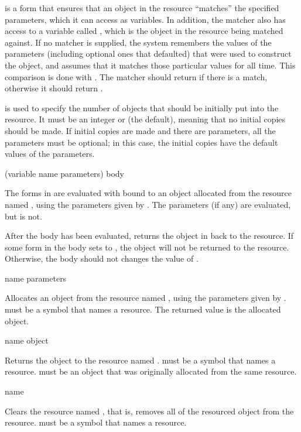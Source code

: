  is a form that ensures that an object in the resource ``matches''
the specified parameters, which it can access as variables.  In addition, the
matcher also has access to a variable called , which is the object in
the resource being matched against.  If no matcher is supplied, the system
remembers the values of the parameters (including optional ones that defaulted)
that were used to construct the object, and assumes that it matches those
particular values for all time. This comparison is done with .  The
matcher should return  if there is a match, otherwise it should
return .

 is used to specify the number of objects that should be
initially put into the resource.  It must be an integer or  (the
default), meaning that no initial copies should be made.  If initial copies are
made and there are parameters, all the parameters must be optional; in this
case, the initial copies have the default values of the parameters.


 {(variable name \rest parameters) \body body}

The forms in  are evaluated with  bound to an object
allocated from the resource named , using the parameters given by
.  The parameters (if any) are evaluated, but  is
not.

After the body has been evaluated,  returns the object in
 back to the resource.  If some form in the body sets
 to , the object will not be returned to the resource.
Otherwise, the body should not changes the value of .


 {name \rest parameters}

Allocates an object from the resource named , using the parameters
given by .   must be a symbol that names a resource.
The returned value is the allocated object.

 {name object}

Returns the object  to the resource named .  
must be a symbol that names a resource.   must be an object that was
originally allocated from the same resource.

 {name}

Clears the resource named , that is, removes all of the resourced
object from the resource.   must be a symbol that names a resource.

